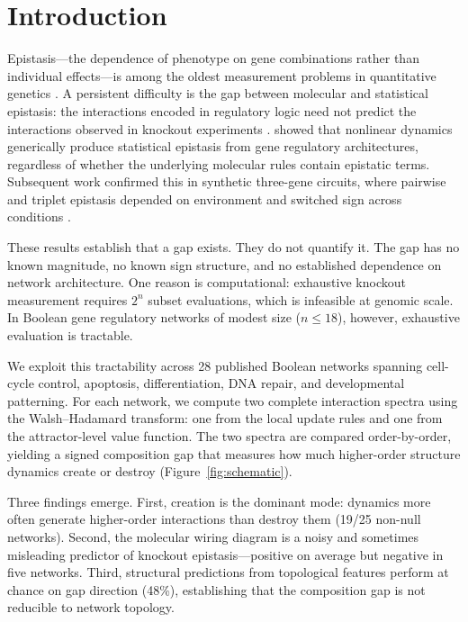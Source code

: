 \documentclass[10pt]{article}
\begin{document}
\section{Introduction}
\label{sec:intro}

Epistasis---the dependence of phenotype on gene combinations rather
than individual effects---is among the oldest measurement problems in
quantitative genetics \citep{fisher1918correlation, bateson1909heredity}. A
persistent difficulty is the gap between molecular and statistical
epistasis: the interactions encoded in regulatory logic need not
predict the interactions observed in knockout experiments
\citep{phillips2008epistasis}. \citet{gjuvsland2007statistical} showed
that nonlinear dynamics generically produce statistical epistasis from
gene regulatory architectures, regardless of whether the underlying
molecular rules contain epistatic terms. Subsequent work confirmed this in synthetic three-gene
circuits, where pairwise and triplet epistasis depended on environment
and switched sign across conditions \citep{baier2023environment}.

These results establish that a gap exists. They do not quantify it.
The gap has no known magnitude, no known sign structure, and no
established dependence on network architecture. One reason is
computational: exhaustive knockout measurement requires $2^n$ subset
evaluations, which is infeasible at genomic scale. In Boolean gene
regulatory networks of modest size ($n \leq 18$), however, exhaustive
evaluation is tractable.

We exploit this tractability across 28 published Boolean networks
spanning cell-cycle control, apoptosis, differentiation, DNA repair,
and developmental patterning. For each network, we compute two
complete interaction spectra using the Walsh--Hadamard transform: one
from the local update rules and one from the attractor-level value
function. The two spectra are compared order-by-order, yielding a
signed composition gap that measures how much higher-order structure
dynamics create or destroy (Figure~\ref{fig:schematic}).

Three findings emerge. First, creation is the dominant mode: dynamics
more often generate higher-order interactions than destroy them (19/25
non-null networks). Second, the molecular wiring diagram is a noisy
and sometimes misleading predictor of knockout epistasis---positive on
average but negative in five networks. Third, structural
predictions from topological features perform at chance on gap
direction (48\%), establishing that the composition gap is not
reducible to network topology.
\end{document}
